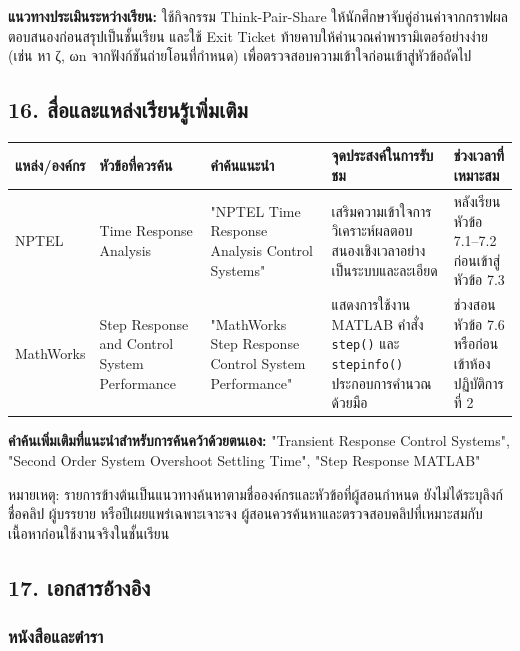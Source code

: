 \textbf{แนวทางประเมินระหว่างเรียน:} ใช้กิจกรรม Think-Pair-Share ให้นักศึกษาจับคู่อ่านค่าจากกราฟผลตอบสนองก่อนสรุปเป็นชั้นเรียน และใช้ Exit Ticket ท้ายคาบให้คำนวณค่าพารามิเตอร์อย่างง่าย (เช่น หา ζ, ωn จากฟังก์ชันถ่ายโอนที่กำหนด) เพื่อตรวจสอบความเข้าใจก่อนเข้าสู่หัวข้อถัดไป



\subsection{16. สื่อและแหล่งเรียนรู้เพิ่มเติม}

\begin{table}[htbp]
    \centering
    \small
    \begin{tabularx}{\textwidth}{@{}>{\raggedright\arraybackslash}p{}*{4}{>{\raggedright\arraybackslash}X}@{}}
        \hline
        \textbf{แหล่ง/องค์กร} & \textbf{หัวข้อที่ควรค้น} & \textbf{คำค้นแนะนำ} & \textbf{จุดประสงค์ในการรับชม} & \textbf{ช่วงเวลาที่เหมาะสม} \\
        \hline
        NPTEL & Time Response Analysis & "NPTEL Time Response Analysis Control Systems" & เสริมความเข้าใจการวิเคราะห์ผลตอบสนองเชิงเวลาอย่างเป็นระบบและละเอียด & หลังเรียนหัวข้อ 7.1–7.2 ก่อนเข้าสู่หัวข้อ 7.3 \\
        MathWorks & Step Response and Control System Performance & "MathWorks Step Response Control System Performance" & แสดงการใช้งาน MATLAB คำสั่ง \texttt{step()} และ \texttt{stepinfo()} ประกอบการคำนวณด้วยมือ & ช่วงสอนหัวข้อ 7.6 หรือก่อนเข้าห้องปฏิบัติการที่ 2 \\
        \hline
    \end{tabularx}
\end{table}

\textbf{คำค้นเพิ่มเติมที่แนะนำสำหรับการค้นคว้าด้วยตนเอง:} "Transient Response Control Systems", "Second Order System Overshoot Settling Time", "Step Response MATLAB"

หมายเหตุ: รายการข้างต้นเป็นแนวทางค้นหาตามชื่อองค์กรและหัวข้อที่ผู้สอนกำหนด ยังไม่ได้ระบุลิงก์ ชื่อคลิป ผู้บรรยาย หรือปีเผยแพร่เฉพาะเจาะจง ผู้สอนควรค้นหาและตรวจสอบคลิปที่เหมาะสมกับเนื้อหาก่อนใช้งานจริงในชั้นเรียน



\subsection{17. เอกสารอ้างอิง}

\subsubsection{หนังสือและตำรา}

